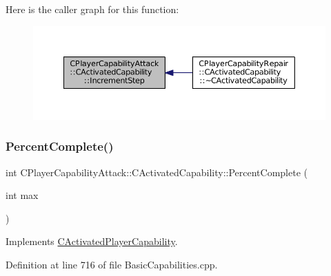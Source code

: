 Here is the caller graph for this function\+:
\nopagebreak
\begin{figure}[H]
\begin{center}
\leavevmode
\includegraphics[width=350pt]{classCPlayerCapabilityAttack_1_1CActivatedCapability_a6b772cbd6be96fbd9bf88380b143856c_icgraph}
\end{center}
\end{figure}
\hypertarget{classCPlayerCapabilityAttack_1_1CActivatedCapability_a75866109b62de0522622b03137461519}{}\label{classCPlayerCapabilityAttack_1_1CActivatedCapability_a75866109b62de0522622b03137461519} 
\subsubsection{\texorpdfstring{Percent\+Complete()}{PercentComplete()}}
{\footnotesize\ttfamily int C\+Player\+Capability\+Attack\+::\+C\+Activated\+Capability\+::\+Percent\+Complete (\begin{DoxyParamCaption}\item[{int}]{max }\end{DoxyParamCaption})\hspace{0.3cm}{\ttfamily [virtual]}}



Implements \hyperlink{classCActivatedPlayerCapability_a405dc6076058006a4f801727de4cfe4d}{C\+Activated\+Player\+Capability}.



Definition at line 716 of file Basic\+Capabilities.\+cpp.


